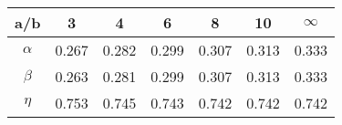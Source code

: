 \begin{table}[H]
	\centering
	\begin{tabular}{ccccccc}
		a/b & 3 & 4 & 6 & 8 & 10 & $\infty$ \\ \toprule
		$\alpha$ & 0.267 & 0.282 & 0.299 & 0.307 & 0.313 & 0.333 \\ \cmidrule{1-7}
		$\beta$ & 0.263 & 0.281 & 0.299 & 0.307 & 0.313 & 0.333 \\ \cmidrule{1-7}
		$\eta$ & 0.753 & 0.745 & 0.743 & 0.742 & 0.742 & 0.742 \\ \cmidrule{1-7}  
	\end{tabular}
\end{table}
